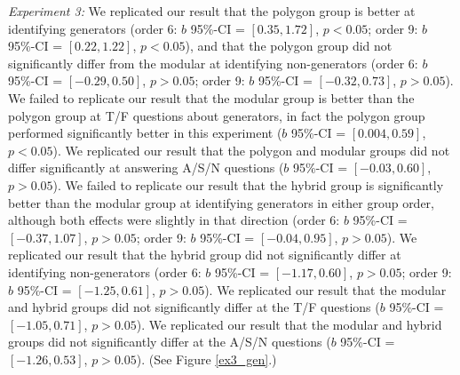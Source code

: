 \documentclass[man,10pt]{apa6}
\begin{document}
\textit{Experiment 3:} We replicated our result that the polygon group is better at identifying generators (order 6: $b$ 95\%-CI = $[0.35,1.72]$, $p < 0.05$; order 9: $b$ 95\%-CI = $[0.22,1.22]$, $p < 0.05$), and that the polygon group did not significantly differ from the modular at identifying non-generators (order 6: $b$ 95\%-CI = $[-0.29,0.50]$, $p > 0.05$; order 9: $b$ 95\%-CI = $[-0.32,0.73]$, $p > 0.05$). We failed to replicate our result that the modular group is better than the polygon group at T/F questions about generators, in fact the polygon group performed significantly better in this experiment ($b$ 95\%-CI = $[0.004,0.59]$, $p < 0.05$). We replicated our result that the polygon and modular groups did not differ significantly at answering A/S/N questions ($b$ 95\%-CI = $[-0.03,0.60]$, $p > 0.05$). We failed to replicate our result that the hybrid group is significantly better than the modular group at identifying generators in either group order, although both effects were slightly in that direction (order 6: $b$ 95\%-CI = $[-0.37,1.07]$, $p > 0.05$; order 9: $b$ 95\%-CI = $[-0.04, 0.95]$, $p > 0.05$). We replicated our result that the hybrid group did not significantly differ at identifying non-generators (order 6: $b$ 95\%-CI = $[-1.17,0.60]$, $p > 0.05$; order 9: $b$ 95\%-CI = $[-1.25,0.61]$, $p > 0.05$). We replicated our result that the modular and hybrid groups did not significantly differ at the T/F questions ($b$ 95\%-CI = $[-1.05, 0.71]$, $p > 0.05$). We replicated our result that the modular and hybrid groups did not significantly differ at the A/S/N questions ($b$ 95\%-CI = $[-1.26,0.53]$, $p > 0.05$). (See Figure \ref{ex3_gen}.) \par
\end{document}
